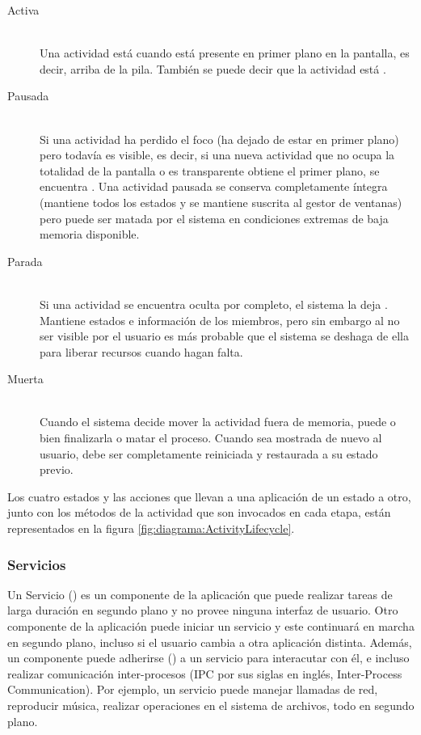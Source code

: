 \begin{description}
    \item[Activa] \hfill \\
     Una actividad está  cuando está presente en primer plano en la pantalla, es decir, arriba de la pila. También se puede decir que la actividad está .

    \item[Pausada] \hfill \\
    Si una actividad ha perdido el foco (ha dejado de estar en primer plano) pero todavía es visible, es decir, si una nueva actividad que no ocupa la totalidad de la pantalla o es transparente obtiene el primer plano, se encuentra . Una actividad pausada se conserva completamente íntegra (mantiene todos los estados y se mantiene suscrita al gestor de ventanas) pero puede ser matada por el sistema en condiciones extremas de baja memoria disponible.

    \item[Parada] \hfill \\
    Si una actividad se encuentra oculta por completo, el sistema la deja . Mantiene estados e información de los miembros, pero sin embargo al no ser visible por el usuario es más probable que el sistema se deshaga de ella para liberar recursos cuando hagan falta.
    
    \item[Muerta] \hfill \\
    Cuando el sistema decide mover la actividad fuera de memoria, puede o bien finalizarla o matar el proceso. Cuando sea mostrada de nuevo al usuario, debe ser completamente reiniciada y restaurada a su estado previo.
\end{description}

    Los cuatro estados y las acciones que llevan a una aplicación de un estado a otro, junto con los métodos de la actividad que son invocados en cada etapa, están representados en la figura \ref{fig:diagrama:ActivityLifecycle}.

\FloatBarrier
\subsubsection{Servicios}
\label{ssec:teo:svc}

Un Servicio () es un componente de la aplicación que puede realizar tareas de larga duración en segundo plano y no provee ninguna interfaz de usuario. Otro componente de la aplicación puede iniciar un servicio y este continuará en marcha en segundo plano, incluso si el usuario cambia a otra aplicación distinta. Además, un componente puede adherirse () a un servicio para interacutar con él, e incluso realizar comunicación inter-procesos (IPC por sus siglas en inglés, Inter-Process Communication). Por ejemplo, un servicio puede manejar llamadas de red, reproducir música, realizar operaciones en el sistema de archivos, todo en segundo plano.

